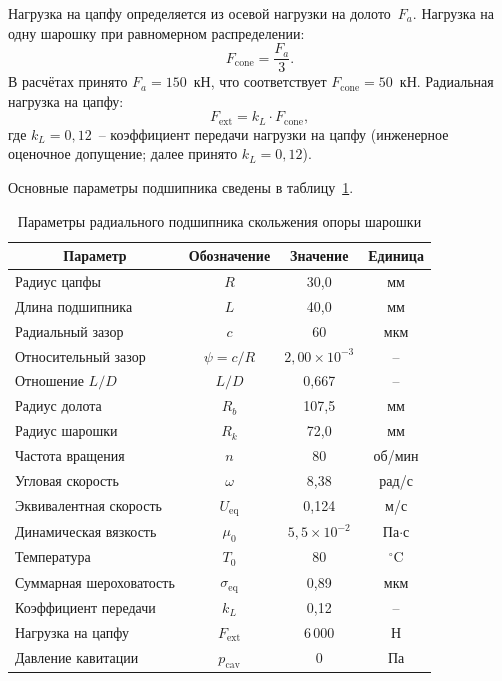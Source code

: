Нагрузка на цапфу определяется из осевой нагрузки на долото~$F_a$.
Нагрузка на одну шарошку при равномерном распределении:
\begin{equation}
  F_{\mathrm{cone}} = \frac{F_a}{3}.
  \label{eq:bit_Fcone}
\end{equation}
В расчётах принято $F_a = 150$~кН, что соответствует
$F_{\mathrm{cone}} = 50$~кН.
Радиальная нагрузка на цапфу:
\begin{equation}
  F_{\mathrm{ext}} = k_L \cdot F_{\mathrm{cone}},
  \label{eq:bit_Fext}
\end{equation}
где $k_L = 0{,}12$~-- коэффициент передачи нагрузки на цапфу
(инженерное оценочное допущение; далее принято $k_L = 0{,}12$).

Основные параметры подшипника сведены в таблицу~\ref{tab:bit_params}.

\begin{table}[!ht]
\centering
\caption{Параметры радиального подшипника скольжения опоры шарошки}
\label{tab:bit_params}
\begin{tabularx}{\textwidth}{|X|c|c|c|}
\hline
\multicolumn{1}{|c|}{\textbf{Параметр}} & \textbf{Обозначение} & \textbf{Значение} & \textbf{Единица} \\
\hline
Радиус цапфы              & $R$              & 30{,}0  & мм \\
\hline
Длина подшипника          & $L$              & 40{,}0  & мм \\
\hline
Радиальный зазор          & $c$              & 60      & мкм \\
\hline
Относительный зазор       & $\psi = c/R$     & $2{,}00 \times 10^{-3}$ & -- \\
\hline
Отношение $L/D$           & $L/D$            & 0{,}667 & -- \\
\hline
Радиус долота             & $R_b$            & 107{,}5 & мм \\
\hline
Радиус шарошки            & $R_k$            & 72{,}0  & мм \\
\hline
Частота вращения          & $n$              & 80      & об/мин \\
\hline
Угловая скорость          & $\omega$         & 8{,}38  & рад/с \\
\hline
Эквивалентная скорость    & $U_{\mathrm{eq}}$ & 0{,}124 & м/с \\
\hline
Динамическая вязкость     & $\mu_0$          & $5{,}5 \times 10^{-2}$ & Па$\cdot$с \\
\hline
Температура               & $T_0$            & 80      & $^{\circ}$C \\
\hline
Суммарная шероховатость   & $\sigma_{\mathrm{eq}}$ & 0{,}89 & мкм \\
\hline
Коэффициент передачи      & $k_L$            & 0{,}12  & -- \\
\hline
Нагрузка на цапфу         & $F_{\mathrm{ext}}$ & 6\,000 & Н \\
\hline
Давление кавитации        & $p_{\mathrm{cav}}$ & 0     & Па \\
\hline
\end{tabularx}
\end{table}

